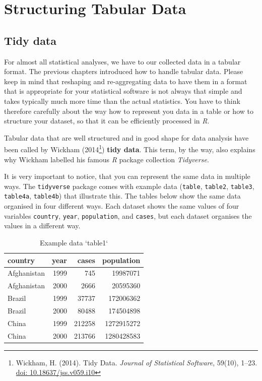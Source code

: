 \documentclass[
]{scrartcl}
\begin{document}
\hypertarget{structuring-tabular-data}{%
\section{Structuring Tabular Data}\label{structuring-tabular-data}}

\hypertarget{tidy-data}{%
\subsection{Tidy data}\label{tidy-data}}

For almost all statistical analyses, we have to our collected data in a tabular format. The previous chapters introduced how to handle tabular data. Please keep in mind that reshaping and re-aggregating data to have them in a format that is appropriate for your statistical software is not always that simple and takes typically much more time than the actual statistics. You have to think therefore carefully about the way how to represent you data in a table or how to structure your dataset, so that it can be efficiently processed in \emph{R}.

Tabular data that are well structured and in good shape for data analysis have been called by Wickham (2014\footnote{Wickham, H. (2014). Tidy Data. \emph{Journal of Statistical Software}, 59(10), 1--23. \href{https://www.jstatsoft.org/v059/i10}{doi: 10.18637/jss.v059.i10}}) \textbf{tidy data}. This term, by the way, also explains why Wickham labelled his famous \emph{R} package collection \emph{Tidyverse}.

It is very important to notice, that you can represent the same data in multiple ways. The \texttt{tidyverse} package comes with example data (\texttt{table}, \texttt{table2}, \texttt{table3}, \texttt{table4a}, \texttt{table4b}) that illustrate this. The tables below show the same data organised in four different ways. Each dataset shows the same values of four variables \texttt{country}, \texttt{year}, \texttt{population}, and \texttt{cases}, but each dataset organises the values in a different way.

\begin{longtable}[t]{lrrr}
\caption{\label{tab:tab1}Example data `table1`}\\
\toprule
country & year & cases & population\\
\midrule
Afghanistan & 1999 & 745 & 19987071\\
Afghanistan & 2000 & 2666 & 20595360\\
Brazil & 1999 & 37737 & 172006362\\
Brazil & 2000 & 80488 & 174504898\\
China & 1999 & 212258 & 1272915272\\
\addlinespace
China & 2000 & 213766 & 1280428583\\
\bottomrule
\end{longtable}
\end{document}
